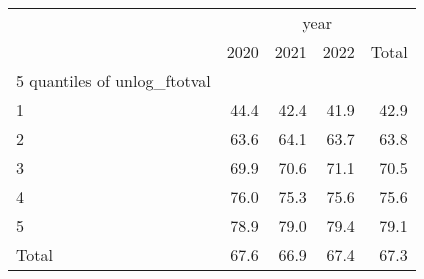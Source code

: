 \begin{tabular}{lllll}
\cline{1-5}
\multicolumn{1}{c}{} &
  \multicolumn{4}{|c}{year} \\
\multicolumn{1}{c}{} &
  \multicolumn{1}{|r}{2020} &
  \multicolumn{1}{r}{2021} &
  \multicolumn{1}{r}{2022} &
  \multicolumn{1}{r}{Total} \\
\cline{1-5}
\multicolumn{1}{l}{5 quantiles of unlog\_ftotval} &
  \multicolumn{1}{|r}{} &
  \multicolumn{1}{r}{} &
  \multicolumn{1}{r}{} &
  \multicolumn{1}{r}{} \\
\multicolumn{1}{l}{\hspace{1em}1} &
  \multicolumn{1}{|r}{44.4} &
  \multicolumn{1}{r}{42.4} &
  \multicolumn{1}{r}{41.9} &
  \multicolumn{1}{r}{42.9} \\
\multicolumn{1}{l}{\hspace{1em}2} &
  \multicolumn{1}{|r}{63.6} &
  \multicolumn{1}{r}{64.1} &
  \multicolumn{1}{r}{63.7} &
  \multicolumn{1}{r}{63.8} \\
\multicolumn{1}{l}{\hspace{1em}3} &
  \multicolumn{1}{|r}{69.9} &
  \multicolumn{1}{r}{70.6} &
  \multicolumn{1}{r}{71.1} &
  \multicolumn{1}{r}{70.5} \\
\multicolumn{1}{l}{\hspace{1em}4} &
  \multicolumn{1}{|r}{76.0} &
  \multicolumn{1}{r}{75.3} &
  \multicolumn{1}{r}{75.6} &
  \multicolumn{1}{r}{75.6} \\
\multicolumn{1}{l}{\hspace{1em}5} &
  \multicolumn{1}{|r}{78.9} &
  \multicolumn{1}{r}{79.0} &
  \multicolumn{1}{r}{79.4} &
  \multicolumn{1}{r}{79.1} \\
\multicolumn{1}{l}{\hspace{1em}Total} &
  \multicolumn{1}{|r}{67.6} &
  \multicolumn{1}{r}{66.9} &
  \multicolumn{1}{r}{67.4} &
  \multicolumn{1}{r}{67.3} \\
\cline{1-5}
\end{tabular}
